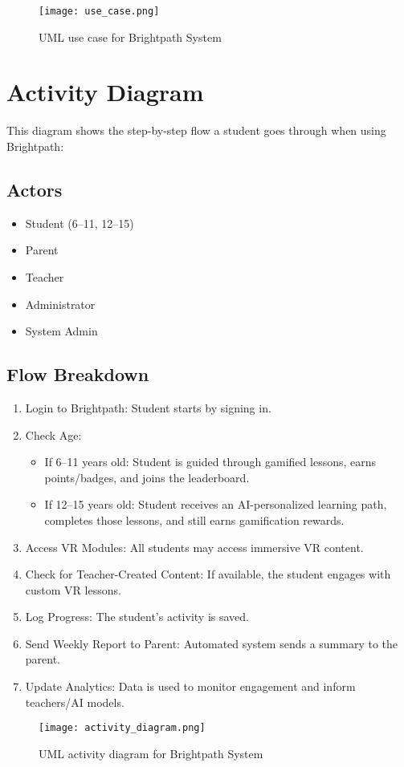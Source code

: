 \documentclass[12pt,a4paper]{article}
\begin{document}
\begin{figure}[H]
  \centering
  \texttt{[image: use\_case.png]}
  \caption{UML use case for Brightpath System}
  \label{fig:class-diagram}
\end{figure}


\section{Activity Diagram}

This diagram shows the step-by-step flow a student goes through when using Brightpath:

\subsection*{Actors}
\begin{itemize}
  \item Student (6–11, 12–15)
  \item Parent
  \item Teacher
  \item Administrator
  \item System Admin
\end{itemize}

\subsection*{Flow Breakdown}
\begin{enumerate}
  \item Login to Brightpath: Student starts by signing in.
  \item Check Age:
  \begin{itemize}
    \item If 6–11 years old: Student is guided through gamified lessons, earns points/badges, and joins the leaderboard.
    \item If 12–15 years old: Student receives an AI-personalized learning path, completes those lessons, and still earns gamification rewards.
  \end{itemize}
  \item Access VR Modules: All students may access immersive VR content.
  \item Check for Teacher-Created Content: If available, the student engages with custom VR lessons.
  \item Log Progress: The student’s activity is saved.
  \item Send Weekly Report to Parent: Automated system sends a summary to the parent.
  \item Update Analytics: Data is used to monitor engagement and inform teachers/AI models.
\end{enumerate}
\begin{figure}[H]
  \centering
  \texttt{[image: activity\_diagram.png]}
  \caption{UML activity diagram for Brightpath System}
  \label{fig:class-diagram}
\end{figure}
\end{document}
